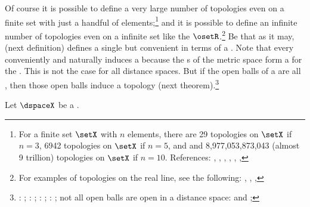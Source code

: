 Of course it is possible to define a very large number of topologies even on a finite set with just a handful of elements;\footnote{
  For a finite set $\setX$ with $n$ elements, there are 
  29 topologies on $\setX$ if $n=3$, 
  6942 topologies on $\setX$ if $n=5$, and
  and 8,977,053,873,043 (almost 9 trillion) topologies on $\setX$ if $n=10$.
  References:  ,
  ,
  ,
  ,
  ,
  ,
  }
and it is possible to define an infinite number of topologies even on a  infinite set
like the  $\osetR$.\footnote{%
  For examples of topologies on the real line, see the following:
      ,
      ,
      ,
  }
Be that as it may,  (next definition) defines a single but convenient 
 in terms of a .
Note that every  conveniently and naturally induces a 
because the s of the metric space form a  for the .
This is not the case for all {distance space}s.
But if the open balls of a  are all , 
then those open balls induce a topology (next theorem).\footnote{
  : ; 
  : ;
  : ;  
  : ;
  not all open balls are open in a distance space:  and ;
  }
\begin{definition}
\label{def:dspacetop}
Let $\dspaceX$ be a . %
\end{definition}

